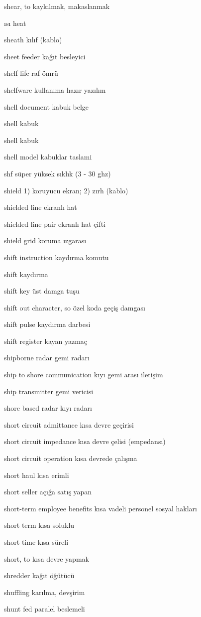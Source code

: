 \documentclass[12pt,fleqn]{article}\usepackage{../../common}
\begin{document}
shear, to kaykılmak, makaslanmak

ısı heat

sheath kılıf (kablo)

sheet feeder kağıt besleyici

shelf life raf ömrü

shelfware kullanıma hazır yazılım

shell document kabuk belge

shell kabuk

shell kabuk

shell model kabuklar taslami

shf süper yüksek sıklık (3 - 30 ghz)

shield 1) koruyucu ekran; 2) zırh (kablo)

shielded line ekranlı hat

shielded line pair ekranlı hat çifti

shield grid koruma ızgarası

shift instruction kaydırma komutu

shift kaydırma

shift key üst damga tuşu

shift out character, so özel koda geçiş damgası

shift pulse kaydırma darbesi

shift register kayan yazmaç

shipborne radar gemi radarı

ship to shore communication kıyı gemi arası iletişim

ship transmitter gemi vericisi

shore based radar kıyı radarı

short circuit admittance kısa devre geçirisi

short circuit impedance kısa devre çelisi (empedansı)

short circuit operation kısa devrede çalışma

short haul kısa erimli

short seller açığa satış yapan

short-term employee benefits kısa vadeli personel sosyal hakları

short term kısa soluklu

short time kısa süreli

short, to kısa devre yapmak

shredder kağıt öğütücü

shuffling karılma, devşirim

shunt fed paralel beslemeli
\end{document}
